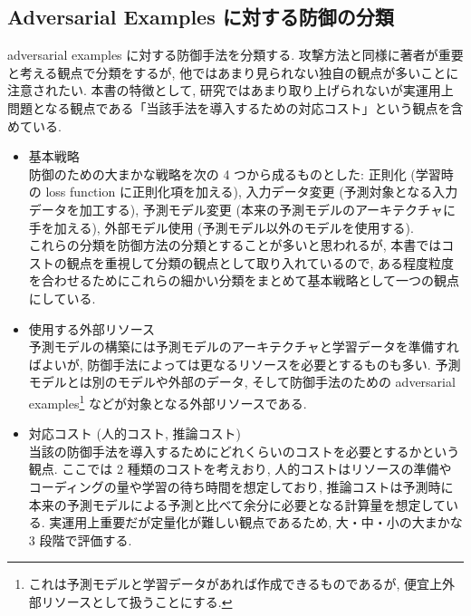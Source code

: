 \subsection{Adversarial Examples に対する防御の分類}
\label{subsec:classification-defense}
adversarial examples に対する防御手法を分類する.
攻撃方法と同様に著者が重要と考える観点で分類をするが, 他ではあまり見られない独自の観点が多いことに注意されたい.
本書の特徴として, 研究ではあまり取り上げられないが実運用上問題となる観点である「当該手法を導入するための対応コスト」という観点を含めている.
%
\begin{itemize}
  \item 基本戦略\\
  防御のための大まかな戦略を次の 4 つから成るものとした: 正則化 (学習時の loss function に正則化項を加える), 入力データ変更 (予測対象となる入力データを加工する), 予測モデル変更 (本来の予測モデルのアーキテクチャに手を加える), 外部モデル使用 (予測モデル以外のモデルを使用する).\\
  これらの分類を防御方法の分類とすることが多いと思われるが, 本書ではコストの観点を重視して分類の観点として取り入れているので, ある程度粒度を合わせるためにこれらの細かい分類をまとめて基本戦略として一つの観点にしている.
  \item 使用する外部リソース\\
  予測モデルの構築には予測モデルのアーキテクチャと学習データを準備すればよいが, 防御手法によっては更なるリソースを必要とするものも多い.
  予測モデルとは別のモデルや外部のデータ, そして防御手法のための adversarial examples\footnote{
  これは予測モデルと学習データがあれば作成できるものであるが, 便宜上外部リソースとして扱うことにする.
  } などが対象となる外部リソースである.
  \item 対応コスト (人的コスト, 推論コスト)\\
  当該の防御手法を導入するためにどれくらいのコストを必要とするかという観点.
  ここでは 2 種類のコストを考えおり, 人的コストはリソースの準備やコーディングの量や学習の待ち時間を想定しており, 推論コストは予測時に本来の予測モデルによる予測と比べて余分に必要となる計算量を想定している.
  実運用上重要だが定量化が難しい観点であるため, 大・中・小の大まかな 3 段階で評価する. 
\end{itemize}
%

